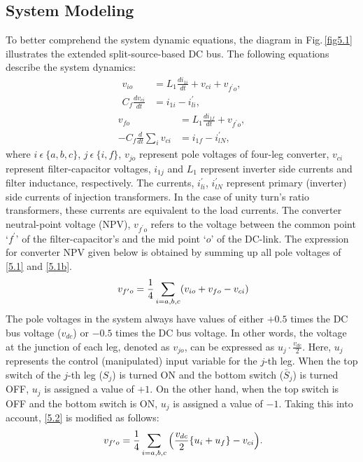 \subsection{System Modeling}
To better comprehend the system dynamic equations, the diagram in Fig.\,\ref{fig5.1} illustrates the extended split-source-based DC bus. The following equations describe the system dynamics:    
\begin{equation} \label{5.1} %
\begin{aligned}
v_{io} &= L_{1}\frac{di_{1i}}{dt} + v_{ci} + v_{f^{\prime}o},  \\
C_{f}\frac{dv_{ci}}{dt} & =	i_{1i} - i^{\prime}_{li},  
\end{aligned}
\end{equation}
\begin{equation} \label{5.1b} %
\begin{aligned}
v_{fo} &= L_{1}\frac{di_{1f}}{dt}  + v_{f^{\prime}o}, \\
-C_{f}\frac{d}{dt}\sum_i v_{ci} & =	i_{1f} - i^{\prime}_{lN},  
\end{aligned}
\end{equation}
where $i ~ \epsilon ~ \{a,b,c\}$, $j ~ \epsilon ~ \{i,f\}$, $v_{jo}$ represent pole voltages of four-leg converter, $v_{ci}$ represent filter-capacitor voltages, $i_{1j}$ and $L_{1}$ represent inverter side currents and filter inductance, respectively. The currents, $i^{\prime}_{li}$, $i^{\prime}_{lN}$ represent primary (inverter) side currents of injection transformers. In the case of unity turn's ratio transformers, these currents are equivalent to the load currents. The converter neutral-point voltage (NPV), $v_{f^{\prime}o}$ refers to the voltage between the common point `$f^{\prime}$' of the filter-capacitor's and the mid point `$o$' of the DC-link. The expression for converter NPV given below is obtained by summing up all pole voltages of \eqref{5.1} and \eqref{5.1b}.
\begin{equation} \label{5.2} %
\ v_{f^{\prime}o} = \frac{1}{4} \sum_{i=a,b,c} (v_{io} + v_{fo} - v_{ci} )\\
\end{equation}
The pole voltages in the system always have values of either $+0.5$ times the DC bus voltage ($v_{dc}$) or $-0.5$ times the DC bus voltage. In other words, the voltage at the junction of each leg, denoted as $v_{jo}$, can be expressed as $u_{j} \cdot \frac{v_{dc}}{2}$. Here, $u_j$ represents the control (manipulated) input variable for the $j$-th leg. When the top switch of the $j$-th leg ($S_{j}$) is turned ON and the bottom switch ($\bar{S}_{j}$) is turned OFF, $u_{j}$ is assigned a value of $+1$. On the other hand, when the top switch is OFF and the bottom switch is ON, $u_{j}$ is assigned a value of $-1$. Taking this into account, \eqref{5.2} is modified as follows:
\begin{equation} \label{5.3} %
\ v_{f^{\prime}o} = \frac{1}{4} \sum_{i=a,b,c} \Big(\frac{v_{dc}}{2}\{ u_{i} + u_{f} \} - v_{ci} \Big). \\
\end{equation}

